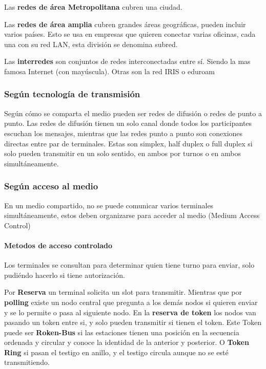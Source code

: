         Las \textbf{redes de área Metropolitana} cubren una ciudad.

        Las \textbf{redes de área amplia} cubren grandes áreas geográficas, pueden incluir varios países. Esto se usa en empresas que quieren conectar varias oficinas, cada una con su red LAN, esta división se denomina subred.

        Las \textbf{interredes} son conjuntos de redes interconectadas entre sí. Siendo la mas famosa Internet (con mayúscula). Otras son la red IRIS o eduroam

    \subsubsection{Según tecnología de transmisión} %
        Según cómo se comparta el medio pueden ser redes de difusión o redes de punto a punto. Las redes de difusión tienen un solo canal donde todos los participantes escuchan los mensajes, mientras que las redes punto a punto son conexiones directas entre par de terminales. Estas son simplex, half duplex o full duplex si solo pueden transmitir en un solo sentido, en ambos por turnos o en ambos simultáneamente.

    \subsubsection{Según acceso al medio} %
        En un medio compartido, no se puede comunicar varios terminales simultáneamente, estos deben organizarse para acceder al medio (Medium Access Control)
        \paragraph{Metodos de acceso controlado}
            Los terminales se consultan para determinar quien tiene turno para enviar, solo pudiéndo hacerlo si tiene autorización.

            Por \textbf{Reserva} un terminal solicita un slot para transmitir. Mientras que por \textbf{polling} existe un nodo central que pregunta a los demás nodos si quieren enviar y se lo permite o pasa al siguiente nodo. En la \textbf{reserva de token} los nodos van pasando un token entre si, y solo pueden transmitir si tienen el token. Este Token puede ser \textbf{Roken-Bus} si las estaciones tienen una posición en la secuencia ordenada y circular y conoce la identidad de la anterior y posterior. O \textbf{Token Ring} si pasan el testigo en anillo, y el testigo circula aunque no se esté transmitiendo.
        
